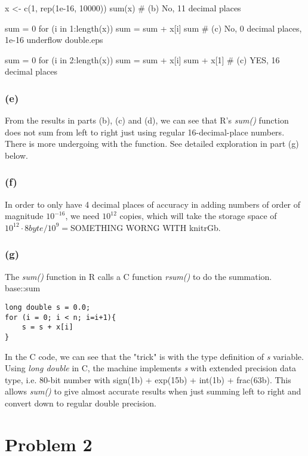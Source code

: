 \documentclass{article}
\newcommand{\rinline}[1]{SOMETHING WORNG WITH knitr}
\begin{document}
x <- c(1, rep(1e-16, 10000))
sum(x) # (b) No, 11 decimal places

sum = 0
for (i in 1:length(x))  sum = sum + x[i]
sum # (c) No, 0 decimal places, 1e-16 underflow double.eps

sum = 0
for (i in 2:length(x))  sum = sum + x[i]
sum + x[1] # (c) YES, 16 decimal places

\subsubsection*{(e)}
From the results in parts (b), (c) and (d), we can see that R's \textit{sum()} function does not sum
from left to right just using regular 16-decimal-place numbers. There is more undergoing with the function.
See detailed exploration in part (g) below.

\subsubsection*{(f)}
In order to only have 4 decimal places of accuracy in adding numbers of order of magnitude $10^{-16}$,
we need $10^{12}$ copies, which will take the storage space of $10^12\cdot 8byte/10^9=$\rinline{1e12*8/1e9}Gb.

\subsubsection*{(g)}
The \textit{sum()} function in R calls a C function \textit{rsum()} to do the summation.
base::sum
\begin{lstlisting}
long double s = 0.0;
for (i = 0; i < n; i=i+1){
	s = s + x[i]
}
\end{lstlisting}

In the C code, we can see that the "trick" is with the type definition of \textit{s} variable.
Using \textit{long double} in C, the machine implements \textit{s} with extended precision data type,
i.e. 80-bit number with sign(1b) + exp(15b) + int(1b) + frac(63b). This allows \textit{sum()} to give
almost accurate results when just summing left to right and convert down to regular double precision.





\newpage
\section*{Problem 2}
\end{document}
